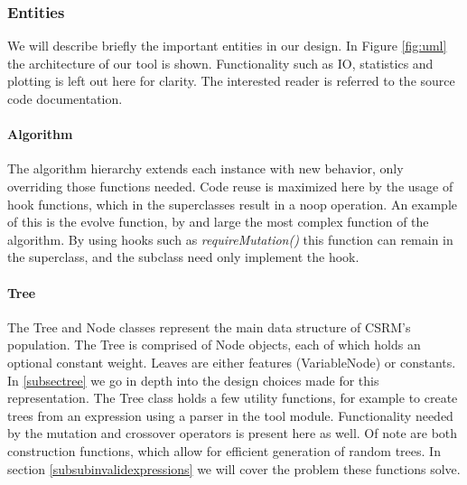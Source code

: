 \subsubsection{Entities}
We will describe briefly the important entities in our design. In Figure \ref{fig:uml} the architecture of our tool is shown. Functionality such as IO, statistics and plotting is left out here for clarity. The interested reader is referred to the source code documentation.
\paragraph{Algorithm}
The algorithm hierarchy extends each instance with new behavior, only overriding those functions needed. Code reuse is maximized here by the usage of hook functions, which in the superclasses result in a noop operation. An example of this is the evolve function, by and large the most complex function of the algorithm. By using hooks such as \textit{requireMutation()} this function can remain in the superclass, and the subclass need only implement the hook.
\paragraph{Tree}
The Tree and Node classes represent the main data structure of CSRM's population. The Tree is comprised of Node objects, each of which holds an optional constant weight. Leaves are either features (VariableNode) or constants. 
In \ref{subsectree} we go in depth into the design choices made for this representation.
The Tree class holds a few utility functions, for example to create trees from an expression using a parser in the tool module.
Functionality needed by the mutation and crossover operators is present here as well. Of note are both construction functions, which allow for efficient generation of random trees. In section \ref{subsubinvalidexpressions} we will cover the problem these functions solve.

